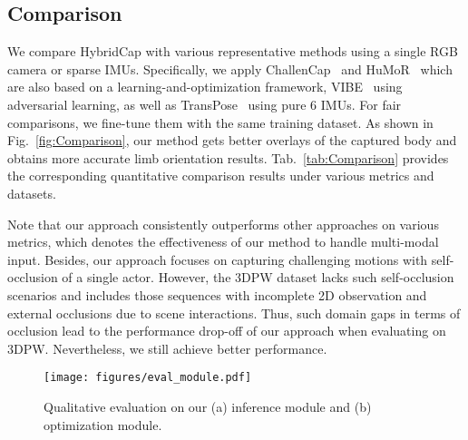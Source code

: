 \documentclass[letterpaper]{article} \usepackage{aaai23}  \usepackage{times}  \usepackage{helvet}  \usepackage{courier}  \usepackage[hyphens]{url}  \usepackage{graphicx} \urlstyle{rm} \def\UrlFont{\rm}  \usepackage{natbib}  \usepackage{caption} \frenchspacing  \setlength{\pdfpagewidth}{8.5in}  \setlength{\pdfpageheight}{11in}  \usepackage{algorithm}
\begin{document}
\vspace{-2mm}
\subsection{Comparison}
\vspace{-1mm}
We compare HybridCap with various representative methods using a single RGB camera or sparse IMUs. 
Specifically, we apply ChallenCap~\cite{challencap} and HuMoR~\cite{HUMOR_ICCV2021} which are also based on a learning-and-optimization framework, VIBE~\cite{VIBE_CVPR2020} using adversarial learning, as well as TransPose~\cite{TransPose2021} using pure 6 IMUs. 
For fair comparisons, we fine-tune them with the same training dataset. 
As shown in Fig.~\ref{fig:Comparison}, our method gets better overlays of the captured body and obtains more accurate limb orientation results.
Tab.~\ref{tab:Comparison} provides the corresponding quantitative comparison results under various metrics and datasets. 

Note that our approach consistently outperforms other approaches on various metrics, which denotes the effectiveness of our method to handle multi-modal input.
Besides, our approach focuses on capturing challenging motions with self-occlusion of a single actor.
However, the 3DPW dataset lacks such self-occlusion scenarios and includes those sequences with incomplete 2D observation and external occlusions due to scene interactions. 
Thus, such domain gaps in terms of occlusion lead to the performance drop-off of our approach when evaluating on 3DPW. 
Nevertheless, we still achieve better performance.


\begin{figure}[t]
	\centering
	\texttt{[image: figures/eval\_module.pdf]}
	\caption{Qualitative evaluation on our (a) inference module and (b) optimization module. }
	\label{fig:ablation_net}
\end{figure}
\end{document}
